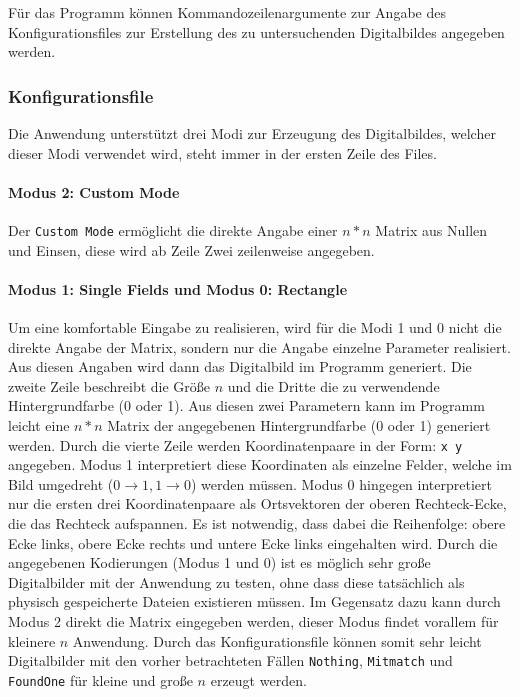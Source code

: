 Für das Programm können Kommandozeilenargumente zur Angabe des Konfigurationsfiles zur Erstellung des zu untersuchenden Digitalbildes angegeben werden.

\subsubsection{Konfigurationsfile}
Die Anwendung unterstützt drei Modi zur Erzeugung des Digitalbildes, welcher dieser Modi verwendet wird, steht immer in der ersten Zeile des Files.
\paragraph{Modus 2: Custom Mode}Der \texttt{Custom Mode} ermöglicht die direkte Angabe einer $n*n$ Matrix aus Nullen und Einsen, diese wird ab Zeile Zwei zeilenweise angegeben.
\paragraph{Modus 1: Single Fields und Modus 0: Rectangle}
Um eine komfortable Eingabe zu realisieren, wird für die Modi 1 und 0 nicht die direkte Angabe der Matrix, sondern nur die Angabe einzelne Parameter realisiert.
Aus diesen Angaben wird dann das Digitalbild im Programm generiert.
Die zweite Zeile beschreibt die Größe $n$ und die Dritte die zu verwendende Hintergrundfarbe (0 oder 1). 
Aus diesen zwei Parametern kann im Programm leicht eine $n*n$ Matrix der angegebenen Hintergrundfarbe (0 oder 1) generiert werden.
Durch die vierte Zeile werden Koordinatenpaare in der Form: \texttt{x y} angegeben. Modus 1 interpretiert diese Koordinaten als einzelne Felder, welche im Bild umgedreht \linebreak ($0 \rightarrow 1,1 \rightarrow 0$) werden müssen. 
Modus 0 hingegen interpretiert nur die ersten drei Koordinatenpaare als Ortsvektoren der oberen Rechteck-Ecke, die das Rechteck aufspannen. 
Es ist notwendig, dass dabei die Reihenfolge: obere Ecke links, obere Ecke rechts und untere Ecke links eingehalten wird.
Durch die angegebenen Kodierungen (Modus 1 und 0) ist es möglich sehr große Digitalbilder mit der Anwendung zu testen, ohne dass diese tatsächlich  als physisch gespeicherte Dateien existieren müssen. 
Im Gegensatz dazu kann durch Modus 2 direkt die Matrix eingegeben werden, dieser Modus findet vorallem für kleinere $n$ Anwendung. 
Durch das Konfigurationsfile können somit sehr leicht Digitalbilder mit den vorher betrachteten Fällen \texttt{Nothing}, \texttt{Mitmatch} und \texttt{FoundOne} für kleine und große $n$ erzeugt werden.
